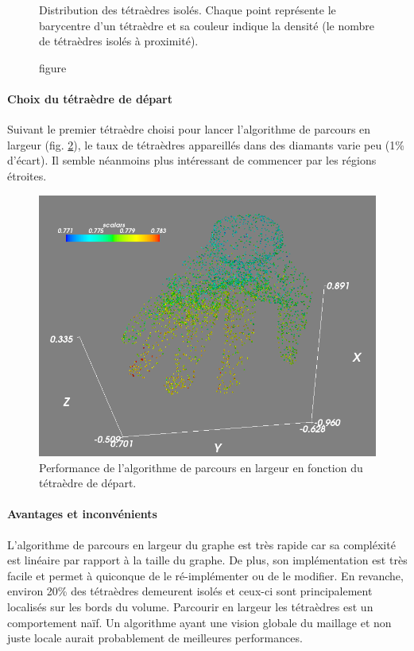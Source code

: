 \documentclass[a4paper,11pt,openany]{article}
\begin{document}
\begin{figure}[H]
\begin{minipage}{.5\textwidth}
  \caption{figure}{Distribution des tétraèdres isolés. Chaque point représente le barycentre d'un tétraèdre et sa couleur indique la densité (le nombre de tétraèdres isolés à proximité).}
  \label{fig:hand_density}
\end{minipage}
\end{figure}

\paragraph{Choix du tétraèdre de départ}
Suivant le premier tétraèdre choisi pour lancer l'algorithme de parcours en largeur (fig. \ref{fig:bfs_starting}), le taux de tétraèdres appareillés dans des diamants varie peu (1\% d'écart). Il semble néanmoins plus intéressant de commencer par les régions étroites.
\begin{figure}[H]
\begin{center}
\includegraphics[scale=0.3]{Images/bfs_starting}
\caption{Performance de l'algorithme de parcours en largeur en fonction du tétraèdre de départ.}
\label{fig:bfs_starting}
\end{center}
\end{figure}
\noindent

\paragraph{Avantages et inconvénients}
L'algorithme de parcours en largeur du graphe est très rapide car sa compléxité est linéaire par rapport à la taille du graphe. De plus, son implémentation est très facile et permet à quiconque de le ré-implémenter ou de le modifier. En revanche, environ 20\% des tétraèdres demeurent isolés et ceux-ci sont principalement localisés sur les bords du volume. Parcourir en largeur les tétraèdres est un comportement naïf. Un algorithme ayant une vision globale du maillage et non juste locale aurait probablement de meilleures performances. 
\end{document}
